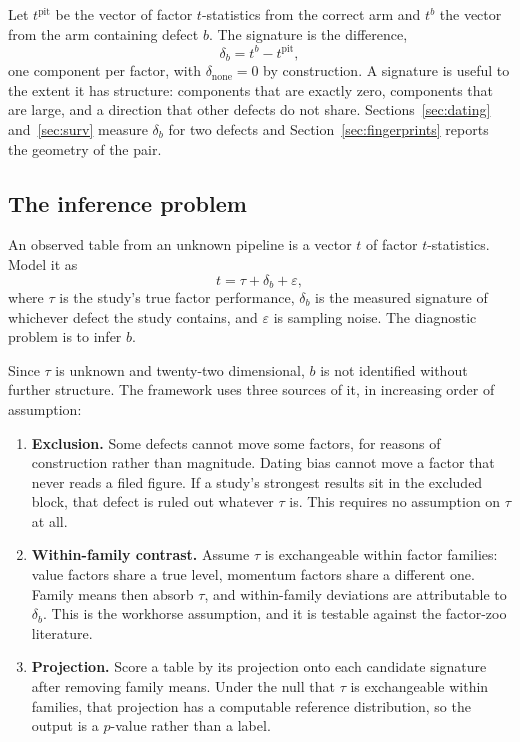 \documentclass[11pt]{article}
\begin{document}
Let $t^{\text{pit}}$ be the vector of factor $t$-statistics from the correct arm and
$t^{b}$ the vector from the arm containing defect $b$. The signature is the difference,
\begin{equation}
\delta_b = t^{b} - t^{\text{pit}},
\label{eq:signature}
\end{equation}
one component per factor, with $\delta_{\text{none}} = 0$ by construction. A signature is
useful to the extent it has structure: components that are exactly zero, components that
are large, and a direction that other defects do not share. Sections~\ref{sec:dating}
and~\ref{sec:surv} measure $\delta_b$ for two defects and Section~\ref{sec:fingerprints}
reports the geometry of the pair.

\subsection{The inference problem}

An observed table from an unknown pipeline is a vector $t$ of factor $t$-statistics. Model
it as
\begin{equation}
t = \tau + \delta_b + \varepsilon,
\label{eq:model}
\end{equation}
where $\tau$ is the study's true factor performance, $\delta_b$ is the measured signature
of whichever defect the study contains, and $\varepsilon$ is sampling noise. The
diagnostic problem is to infer $b$.

Since $\tau$ is unknown and twenty-two dimensional, $b$ is not identified without further
structure. The framework uses three sources of it, in increasing order of assumption:

\begin{enumerate}
\item \textbf{Exclusion.} Some defects cannot move some factors, for reasons of
construction rather than magnitude. Dating bias cannot move a factor that never reads a
filed figure. If a study's strongest results sit in the excluded block, that defect is
ruled out whatever $\tau$ is. This requires no assumption on $\tau$ at all.
\item \textbf{Within-family contrast.} Assume $\tau$ is exchangeable within factor
families: value factors share a true level, momentum factors share a different one. Family
means then absorb $\tau$, and within-family deviations are attributable to $\delta_b$.
This is the workhorse assumption, and it is testable against the factor-zoo literature.
\item \textbf{Projection.} Score a table by its projection onto each candidate signature
after removing family means. Under the null that $\tau$ is exchangeable within families,
that projection has a computable reference distribution, so the output is a $p$-value
rather than a label.
\end{enumerate}
\end{document}
